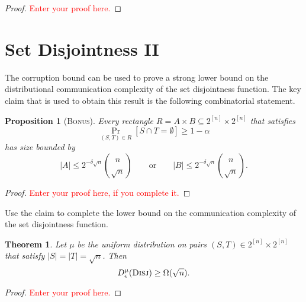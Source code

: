 \documentclass[11pt]{amsart}
\theoremstyle{plain}
\newtheorem{theorem}{Theorem}
\newtheorem{proposition}{Proposition}
\theoremstyle{definition}
\theoremstyle{plain}
\newcommand{\replacethistext}[1]{\textcolor{red}{#1}}
\begin{document}
\begin{proof}
\replacethistext{Enter your proof here.}
\end{proof}



\newpage \section{Set Disjointness II}

The corruption bound can be used to prove a strong lower bound on the distributional communication complexity of the set disjointness function. The key claim that is used to obtain this result is the following combinatorial statement.

\begin{proposition}[\textsc{Bonus}]
Every rectangle $R = A \times B \subseteq 2^{[n]} \times 2^{[n]}$
that satisfies 
\[
\Pr_{(S,T) \in R}[ S \cap T = \emptyset ] \ge 1-\alpha
\]
has size bounded by
\[
|A| \le 2^{-\delta \sqrt{n}} \binom{n}{\sqrt{n}}
\qquad \mbox{or} \qquad
|B| \le 2^{-\delta \sqrt{n}} \binom{n}{\sqrt{n}}.
\]
\end{proposition}

\begin{proof}
\replacethistext{Enter your proof here, if you complete it.}
\end{proof}

Use the claim to complete the lower bound on the communication complexity of the set disjointness function.

\begin{theorem}
Let $\mu$ be the uniform distribution on pairs $(S,T) \in 2^{[n]} \times 2^{[n]}$ that satisfy $|S| = |T| = \sqrt{n}$. Then
\[
D_\epsilon^{\mu}(\textsc{Disj}) \ge \Omega(\sqrt{n}).
\]
\end{theorem}

\begin{proof}
\replacethistext{Enter your proof here.}
\end{proof}
\end{document}

